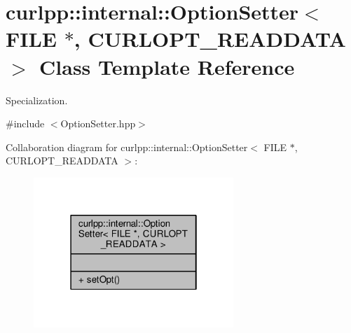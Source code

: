 \hypertarget{classcurlpp_1_1internal_1_1OptionSetter_3_01FILE_01_5_00_01CURLOPT__READDATA_01_4}{\section{curlpp\-:\-:internal\-:\-:Option\-Setter$<$ F\-I\-L\-E $\ast$, C\-U\-R\-L\-O\-P\-T\-\_\-\-R\-E\-A\-D\-D\-A\-T\-A $>$ Class Template Reference}
\label{classcurlpp_1_1internal_1_1OptionSetter_3_01FILE_01_5_00_01CURLOPT__READDATA_01_4}
}


Specialization.  




{\ttfamily \#include $<$Option\-Setter.\-hpp$>$}



Collaboration diagram for curlpp\-:\-:internal\-:\-:Option\-Setter$<$ F\-I\-L\-E $\ast$, C\-U\-R\-L\-O\-P\-T\-\_\-\-R\-E\-A\-D\-D\-A\-T\-A $>$\-:
\nopagebreak
\begin{figure}[H]
\begin{center}
\leavevmode
\includegraphics[width=214pt]{classcurlpp_1_1internal_1_1OptionSetter_3_01FILE_01_5_00_01CURLOPT__READDATA_01_4__coll__graph}
\end{center}
\end{figure}
